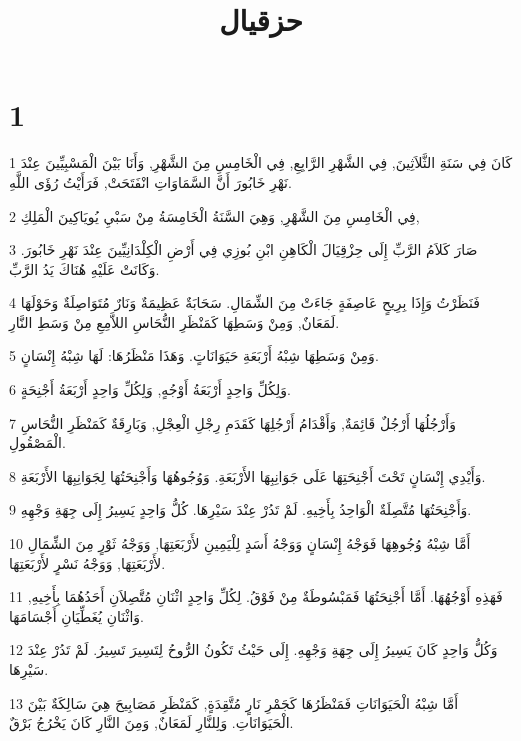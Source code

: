 

\title{حزقيال}


\chapter{1}

\par 1 كَانَ فِي سَنَةِ الثَّلاَثِينَ, فِي الشَّهْرِ الرَّابِعِ, فِي الْخَامِسِ مِنَ الشَّهْرِ, وَأَنَا بَيْنَ الْمَسْبِيِّينَ عِنْدَ نَهْرِ خَابُورَ أَنَّ السَّمَاوَاتِ انْفَتَحَتْ, فَرَأَيْتُ رُؤَى اللَّهِ.
\par 2 فِي الْخَامِسِ مِنَ الشَّهْرِ, وَهِيَ السَّنَةُ الْخَامِسَةُ مِنْ سَبْيِ يُويَاكِينَ الْمَلِكِ,
\par 3 صَارَ كَلاَمُ الرَّبِّ إِلَى حِزْقِيَالَ الْكَاهِنِ ابْنِ بُوزِي فِي أَرْضِ الْكِلْدَانِيِّينَ عِنْدَ نَهْرِ خَابُورَ. وَكَانَتْ عَلَيْهِ هُنَاكَ يَدُ الرَّبِّ.
\par 4 فَنَظَرْتُ وَإِذَا بِرِيحٍ عَاصِفَةٍ جَاءَتْ مِنَ الشِّمَالِ. سَحَابَةٌ عَظِيمَةٌ وَنَارٌ مُتَوَاصِلَةٌ وَحَوْلَهَا لَمَعَانٌ, وَمِنْ وَسَطِهَا كَمَنْظَرِ النُّحَاسِ اللاَّمِعِ مِنْ وَسَطِ النَّارِ.
\par 5 وَمِنْ وَسَطِهَا شِبْهُ أَرْبَعَةِ حَيَوَانَاتٍ. وَهَذَا مَنْظَرُهَا: لَهَا شِبْهُ إِنْسَانٍ.
\par 6 وَلِكُلِّ وَاحِدٍ أَرْبَعَةُ أَوْجُهٍ, وَلِكُلِّ وَاحِدٍ أَرْبَعَةُ أَجْنِحَةٍ.
\par 7 وَأَرْجُلُهَا أَرْجُلٌ قَائِمَةٌ, وَأَقْدَامُ أَرْجُلِهَا كَقَدَمِ رِجْلِ الْعِجْلِ, وَبَارِقَةٌ كَمَنْظَرِ النُّحَاسِ الْمَصْقُولِ.
\par 8 وَأَيْدِي إِنْسَانٍ تَحْتَ أَجْنِحَتِهَا عَلَى جَوَانِبِهَا الأَرْبَعَةِ. وَوُجُوهُهَا وَأَجْنِحَتُهَا لِجَوَانِبِهَا الأَرْبَعَةِ.
\par 9 وَأَجْنِحَتُهَا مُتَّصِلَةٌ الْوَاحِدُ بِأَخِيهِ. لَمْ تَدُرْ عِنْدَ سَيْرِهَا. كُلُّ وَاحِدٍ يَسِيرُ إِلَى جِهَةِ وَجْهِهِ.
\par 10 أَمَّا شِبْهُ وُجُوهِهَا فَوَجْهُ إِنْسَانٍ وَوَجْهُ أَسَدٍ لِلْيَمِينِ لأَرْبَعَتِهَا, وَوَجْهُ ثَوْرٍ مِنَ الشِّمَالِ لأَرْبَعَتِهَا, وَوَجْهُ نَسْرٍ لأَرْبَعَتِهَا.
\par 11 فَهَذِهِ أَوْجُهُهَا. أَمَّا أَجْنِحَتُهَا فَمَبْسُوطَةٌ مِنْ فَوْقُ. لِكُلِّ وَاحِدٍ اثْنَانِ مُتَّصِلاَنِ أَحَدُهُمَا بِأَخِيهِ, وَاثْنَانِ يُغَطِّيَانِ أَجْسَامَهَا.
\par 12 وَكُلُّ وَاحِدٍ كَانَ يَسِيرُ إِلَى جِهَةِ وَجْهِهِ. إِلَى حَيْثُ تَكُونُ الرُّوحُ لِتَسِيرَ تَسِيرُ. لَمْ تَدُرْ عِنْدَ سَيْرِهَا.
\par 13 أَمَّا شِبْهُ الْحَيَوَانَاتِ فَمَنْظَرُهَا كَجَمْرِ نَارٍ مُتَّقِدَةٍ, كَمَنْظَرِ مَصَابِيحَ هِيَ سَالِكَةٌ بَيْنَ الْحَيَوَانَاتِ. وَلِلنَّارِ لَمَعَانٌ, وَمِنَ النَّارِ كَانَ يَخْرُجُ بَرْقٌ.
